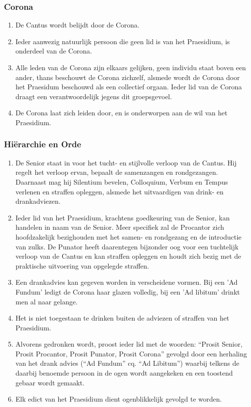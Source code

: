 \subsubsection*{Corona}
\begin{enumerate}
    \item De Cantus wordt belijdt door de Corona.
    \item Ieder aanwezig natuurlijk persoon die geen lid is van het Praesidium, is onderdeel van de Corona. 
    \item Alle leden van de Corona zijn elkaars gelijken, geen individu staat boven een ander, thans beschouwt de Corona zichzelf, alsmede wordt de Corona door het Praesidum beschouwd als een collectief orgaan. Ieder lid van de Corona draagt een verantwoordelijk jegens dit groepsgevoel.
    \item De Corona laat zich leiden door, en is onderworpen aan de wil van het Praesidium.
\end{enumerate}

\subsubsection*{Hi\"erarchie en Orde}
\begin{enumerate}
    \item De Senior staat in voor het tucht- en stijlvolle verloop van de Cantus. Hij regelt het verloop ervan, bepaalt de samenzangen en rondgezangen. Daarnaast mag hij Silentium bevelen, Colloquium, Verbum en Tempus verlenen en straffen opleggen, alsmede het uitvaardigen van drink- en drankadviezen.
    \item Ieder lid van het Praesidium, krachtens goedkeuring van de Senior, kan handelen in naam van de Senior. Meer specifiek zal de Procantor zich hoofdzakelijk bezighouden met het samen- en rondgezang en de introductie van zulks. De Punator heeft daarentegen bijzonder oog voor een tuchtelijk verloop van de Cantus en kan straffen opleggen en houdt zich bezig met de praktische uitvoering van opgelegde straffen.
    \item Een drankadvies kan gegeven worden in verscheidene vormen. Bij een 'Ad Fundum' ledigt de Corona haar glazen volledig, bij een 'Ad libitum' drinkt men al naar gelange.
    \item Het is niet toegestaan te drinken buiten de adviezen of straffen van het Praesidium. 
    \item Alvorens gedronken wordt, proost ieder lid met de woorden: ``Prosit Senior, Prosit Procantor, Prosit Punator, Prosit Corona'' gevolgd door een herhaling van het drank advies (``Ad Fundum'' cq. ``Ad Libitum'') waarbij telkens de daarbij benoemde persoon in de ogen wordt aangekeken en een toostend gebaar wordt gemaakt.
    \item Elk edict van het Praesidium dient ogenblikkelijk gevolgd te worden.
\end{enumerate}

